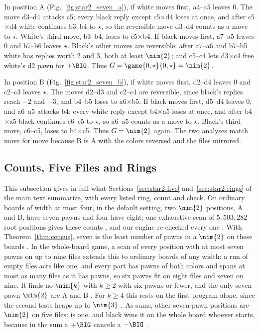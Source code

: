 In position A (Fig.~\ref{fig:star2_seven_a}), if white moves first, a4--a5 leaves $0$. The move d3--d4 attacks
c5; every black reply except c5$\times$d4 loses at once, and after c5$\times$d4 white continues b3--b4 to
$\star$, so the reversible move d3--d4 counts as a move to $\star$. White's third move, b3--b4, loses to
c5$\times$b4. If black moves first, a7--a5 leaves $0$ and b7--b6 leaves $\star$. Black's other moves are
reversible: after a7--a6 and b7--b5 white has replies worth $2$ and $3$, both at least $\nim{2}$; and c5--c4
lets d3$\times$c4 free white's d2 pawn for $+\BIG$. Thus
$G=\game{0,\star}{0,\star}=\nim{2}$.

In position B (Fig.~\ref{fig:star2_seven_b}), if white moves first, d2--d4 leaves $0$ and c2--c3 leaves
$\star$. The moves d2--d3 and c2--c4 are reversible, since black's replies reach $-2$ and $-3$, and b4--b5
loses to a6$\times$b5. If black moves first, d5--d4 leaves $0$, and a6--a5 attacks b4: every white reply except
b4$\times$a5 loses at once, and after b4$\times$a5 black continues c6--c5 to $\star$, so a6--a5 counts as a move
to $\star$. Black's third move, c6--c5, loses to b4$\times$c5. Thus $G=\nim{2}$ again. The two analyses
match move for move because B is A with the colors reversed and the files mirrored.

\subsection{Counts, Five Files and Rings}
This subsection gives in full what Sections~\ref{sec:star2-five} and~\ref{sec:star2-rings} of the main text summarize, with every listed ring, count and check.
On ordinary boards of width at most four, in the default setting, two $\nim{2}$ positions, A and B, have seven pawns
and four have eight; one exhaustive scan of $5{,}503{,}282$ root positions gives these counts , and our
engine re-checked every one . With
Theorem~\ref{thm:census}, seven is the least number of pawns in a $\nim{2}$ on these boards . In the
whole-board game, a scan of every position with at most seven pawns on up to nine files extends this to ordinary
boards of any width: a run of empty files acts like one, and every part has pawns of both colors and spans at most
as many files as it has pawns, so six pawns fit on eight files and seven on nine. It finds no $\nim{k}$ with $k\ge2$ with six pawns or fewer, and the only seven-pawn $\nim{2}$ are A and
B . For $k\ge4$ this rests on the first program alone, since the second tests heaps up to $\nim{3}$ . As sums, other seven-pawn positions are $\nim{2}$ on five files:  is one, and black wins it on the whole board whoever starts, because in the sum a $+\BIG$ cancels a $-\BIG$ .

